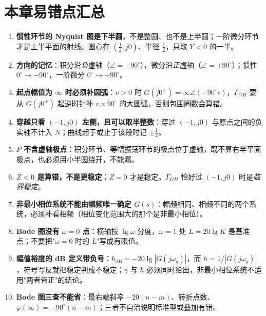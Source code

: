 \section{本章易错点汇总}
\begin{enumerate}
    \item \textbf{惯性环节的 Nyquist 图是下半圆}，不是整圆、也不是上半圆；一阶微分环节才是上半平面的射线。圆心在 $(\tfrac12,j0)$、半径 $\tfrac12$，只取 $Y<0$ 的一半。
    \item \textbf{方向的记忆}：积分沿\emph{负}虚轴（$\angle=-90^\circ$），微分沿\emph{正}虚轴（$\angle=+90^\circ$）；惯性 $0^\circ\to-90^\circ$，一阶微分 $0^\circ\to+90^\circ$。
    \item \textbf{起点幅值为 $\infty$ 时必须补圆弧}：$v>0$ 时 $G(j0^+)=\infty\angle(-90^\circ v)$，$\Gamma_{GH}$ 要从 $G(j0^+)$ 起逆时针补 $v\times90^\circ$ 的大圆弧，否则包围圈数会算错。
    \item \textbf{穿越只看 $(-1,j0)$ 左侧，且可以取半整数}：穿过 $(-1,j0)$ 与原点之间的负实轴不计入 $N$；曲线起于或止于该段时记 $\pm\frac12$。
    \item \textbf{$P$ 不含虚轴极点}：积分环节、等幅振荡环节的极点位于虚轴，既不算右半平面极点，也必须用小半圆绕开，不能漏。
    \item \textbf{$Z<0$ 是算错，不是更稳定}；$Z=0$ 才是稳定。$\Gamma_{GH}$ 恰好过 $(-1,j0)$ 时是\emph{临界稳定}。
    \item \textbf{非最小相位系统不能由幅频唯一确定 $G(s)$}：幅频相同、相频不同的两个系统，必须补看相频（相位变化范围大的那个是非最小相位）。
    \item \textbf{Bode 图没有 $\omega=0$ 点}：横轴按 $\lg\omega$ 分度，$\omega=1$ 处 $L=20\lg K$ 是基准点；不要把"$\omega=0$ 时的 $L$"写成有限值。
    \item \textbf{幅值裕度的 dB 定义带负号}：$h_{\mathrm{dB}}=-20\lg|G(j\omega_g)|$，而 $h=1/|G(j\omega_g)|$，符号写反就把稳定判成不稳定；$\gamma$ 与 $h$ 必须同时给出，非最小相位系统不适用"两者皆正"的结论。
    \item \textbf{Bode 图三查不能省}：最右端斜率 $-20(n-m)$、转折点数、$\varphi(\infty)=-90^\circ(n-m)$；三者不自治说明标准型或叠加有错。
\end{enumerate}

\setlength{\parskip}{0pt plus 1pt}
\renewcommand{\arraystretch}{1}
\setlength{\tabcolsep}{6pt}
